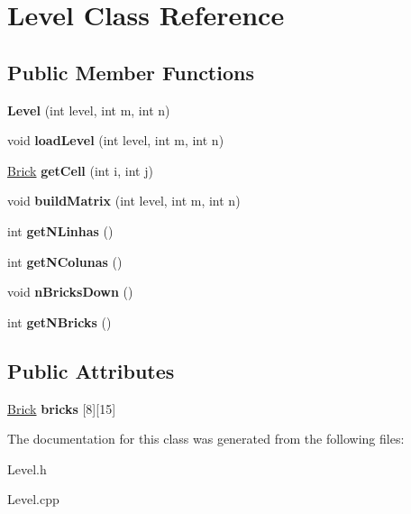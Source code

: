 \hypertarget{class_level}{\section{\-Level \-Class \-Reference}
\label{class_level}
}
\subsection*{\-Public \-Member \-Functions}
\begin{DoxyCompactItemize}
\item 
\hypertarget{class_level_a48ffe775b5db813d30345193940c38f1}{{\bfseries \-Level} (int level, int m, int n)}\label{class_level_a48ffe775b5db813d30345193940c38f1}

\item 
\hypertarget{class_level_a360279fc2b29e9b692c1bb49b81f7089}{void {\bfseries load\-Level} (int level, int m, int n)}\label{class_level_a360279fc2b29e9b692c1bb49b81f7089}

\item 
\hypertarget{class_level_a2cd065f4d001fb3691cacbfb4f23b322}{\hyperlink{class_brick}{\-Brick} {\bfseries get\-Cell} (int i, int j)}\label{class_level_a2cd065f4d001fb3691cacbfb4f23b322}

\item 
\hypertarget{class_level_ada477dcc4223f09f2a896f307daa06a0}{void {\bfseries build\-Matrix} (int level, int m, int n)}\label{class_level_ada477dcc4223f09f2a896f307daa06a0}

\item 
\hypertarget{class_level_aa5cf9a91b95142b8075cd1ba6e6fc062}{int {\bfseries get\-N\-Linhas} ()}\label{class_level_aa5cf9a91b95142b8075cd1ba6e6fc062}

\item 
\hypertarget{class_level_a7a07e792f90e967c07d7c8379d272b7c}{int {\bfseries get\-N\-Colunas} ()}\label{class_level_a7a07e792f90e967c07d7c8379d272b7c}

\item 
\hypertarget{class_level_ac022c67ce4529765d2687a9435657e2e}{void {\bfseries n\-Bricks\-Down} ()}\label{class_level_ac022c67ce4529765d2687a9435657e2e}

\item 
\hypertarget{class_level_a7afb7349a2dfbc61430fe4aacc3c7d64}{int {\bfseries get\-N\-Bricks} ()}\label{class_level_a7afb7349a2dfbc61430fe4aacc3c7d64}

\end{DoxyCompactItemize}
\subsection*{\-Public \-Attributes}
\begin{DoxyCompactItemize}
\item 
\hypertarget{class_level_a6d46667fda535ac4e9b5f34daec5c7de}{\hyperlink{class_brick}{\-Brick} {\bfseries bricks} \mbox{[}8\mbox{]}\mbox{[}15\mbox{]}}\label{class_level_a6d46667fda535ac4e9b5f34daec5c7de}

\end{DoxyCompactItemize}


\-The documentation for this class was generated from the following files\-:\begin{DoxyCompactItemize}
\item 
\-Level.\-h\item 
\-Level.\-cpp\end{DoxyCompactItemize}
